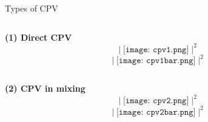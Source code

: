 \begin{frame}{Types of CPV}
    \begin{columns}[T]
        \begin{column}{.66\textwidth}
            \begin{column}{.5\textwidth}
                \centering
                \textbf{(1) Direct CPV}
                \begin{equation*}
                    \left| \; \texttt{[image: cpv1.png]} \; \right|^2
                \end{equation*}
                \scalebox{1.5}{$\neq$}
                \begin{equation*}
                    \left| \; \texttt{[image: cpv1bar.png]} \; \right|^2
                \end{equation*}
            \end{column}
            \begin{column}{.5\textwidth}
                \centering
                \textbf{(2) CPV in mixing}
                \begin{equation*}
                    \left| \; \texttt{[image: cpv2.png]} \; \right|^2
                \end{equation*}
                \scalebox{1.5}{$\neq$}
                \begin{equation*}
                    \left| \; \texttt{[image: cpv2bar.png]} \; \right|^2
                \end{equation*}
            \end{column}


\end{column}
\end{columns}
\end{frame}
